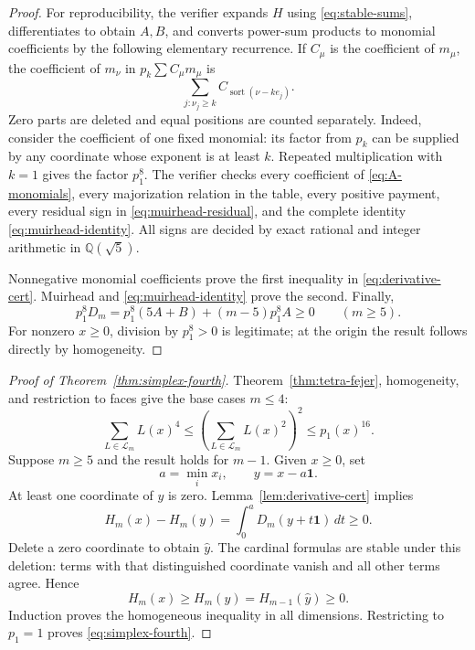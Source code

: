 \documentclass[11pt,a4paper]{article}
\theoremstyle{definition}
\theoremstyle{remark}
\numberwithin{equation}{section}
\begin{document}
\begin{proof}
For reproducibility, the verifier expands $H$ using
\eqref{eq:stable-sums}, differentiates to obtain $A,B$, and converts
power-sum products to monomial coefficients by the following elementary
recurrence.  If $C_\mu$ is the coefficient of $m_\mu$, the
coefficient of $m_\nu$ in $p_k\sum C_\mu m_\mu$ is
\begin{equation}\label{eq:symmetric-recurrence}
 \sum_{j:\nu_j\ge k}
 C_{\operatorname{sort}(\nu-k e_j)}.
\end{equation}
Zero parts are deleted and equal positions are counted separately.
Indeed, consider the coefficient of one fixed monomial: its factor
from $p_k$ can be supplied by any coordinate whose exponent is at least
$k$.  Repeated multiplication with $k=1$ gives the factor $p_1^8$.
The verifier checks every coefficient of
\eqref{eq:A-monomials}, every majorization relation in the table, every
positive payment, every residual sign in
\eqref{eq:muirhead-residual}, and the complete identity
\eqref{eq:muirhead-identity}.  All signs are decided by exact rational
and integer arithmetic in $\mathbb Q(\sqrt5)$.

Nonnegative monomial coefficients prove the first inequality in
\eqref{eq:derivative-cert}.  Muirhead and
\eqref{eq:muirhead-identity} prove the second.  Finally,
\[
 p_1^8D_m=p_1^8(5A+B)+(m-5)p_1^8A\ge0
 \qquad(m\ge5).
\]
For nonzero $x\ge0$, division by $p_1^8>0$ is legitimate; at the
origin the result follows directly by homogeneity.
\end{proof}

\begin{proof}[Proof of Theorem~\ref{thm:simplex-fourth}]
Theorem~\ref{thm:tetra-fejer}, homogeneity, and restriction to faces
give the base cases $m\le4$:
\[
 \sum_{L\in\mathcal L_m}L(x)^4
 \le\left(\sum_{L\in\mathcal L_m}L(x)^2\right)^2
 \le p_1(x)^{16}.
\]
Suppose $m\ge5$ and the result holds for $m-1$.  Given $x\ge0$, set
\[
 a=\min_i x_i,\qquad y=x-a\boldsymbol1.
\]
At least one coordinate of $y$ is zero.  Lemma~\ref{lem:derivative-cert}
implies
\[
 H_m(x)-H_m(y)=\int_0^a D_m(y+t\boldsymbol1)\,dt\ge0.
\]
Delete a zero coordinate to obtain $\widehat y$.  The cardinal formulas
are stable under this deletion: terms with that distinguished
coordinate vanish and all other terms agree.  Hence
\[
 H_m(x)\ge H_m(y)=H_{m-1}(\widehat y)\ge0.
\]
Induction proves the homogeneous inequality in all dimensions.
Restricting to $p_1=1$ proves \eqref{eq:simplex-fourth}.
\end{proof}
\end{document}
